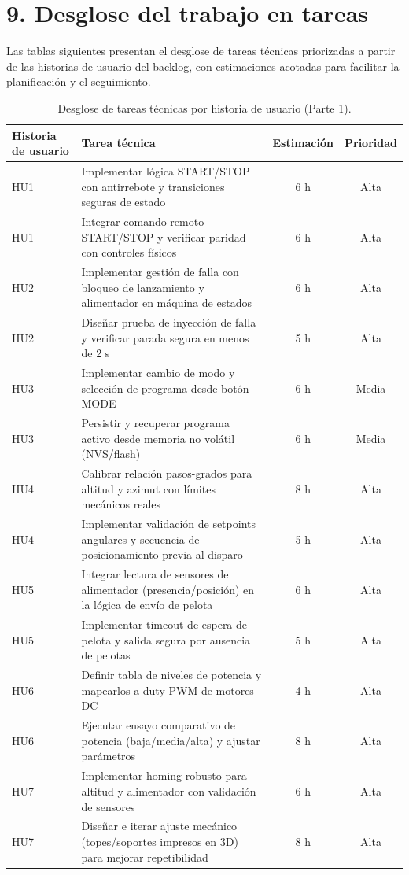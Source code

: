 ﻿\documentclass[
11pt, %
]{charter}
\begin{document}
\section{9. Desglose del trabajo en tareas}
\label{sec:wbs}
Las tablas siguientes presentan el desglose de tareas técnicas priorizadas a partir de las historias de usuario del backlog, con estimaciones acotadas para facilitar la planificación y el seguimiento.
\begin{table}[htpb]
\centering
\caption{Desglose de tareas técnicas por historia de usuario (Parte 1).}
\begin{tabularx}{\linewidth}{@{}|X|X|c|c|@{}}
\hline
\rowcolor[HTML]{C0C0C0}
Historia de usuario & Tarea técnica & Estimación & Prioridad \\ \hline
HU1 & Implementar lógica START/STOP con antirrebote y transiciones seguras de estado & 6 h & Alta \\ \hline
HU1 & Integrar comando remoto START/STOP y verificar paridad con controles físicos & 6 h & Alta \\ \hline
HU2 & Implementar gestión de falla con bloqueo de lanzamiento y alimentador en máquina de estados & 6 h & Alta \\ \hline
HU2 & Diseñar prueba de inyección de falla y verificar parada segura en menos de 2 s & 5 h & Alta \\ \hline
HU3 & Implementar cambio de modo y selección de programa desde botón MODE & 6 h & Media \\ \hline
HU3 & Persistir y recuperar programa activo desde memoria no volátil (NVS/flash) & 6 h & Media \\ \hline
HU4 & Calibrar relación pasos-grados para altitud y azimut con límites mecánicos reales & 8 h & Alta \\ \hline
HU4 & Implementar validación de setpoints angulares y secuencia de posicionamiento previa al disparo & 5 h & Alta \\ \hline
HU5 & Integrar lectura de sensores de alimentador (presencia/posición) en la lógica de envío de pelota & 6 h & Alta \\ \hline
HU5 & Implementar timeout de espera de pelota y salida segura por ausencia de pelotas & 5 h & Alta \\ \hline
HU6 & Definir tabla de niveles de potencia y mapearlos a duty PWM de motores DC & 4 h & Alta \\ \hline
HU6 & Ejecutar ensayo comparativo de potencia (baja/media/alta) y ajustar parámetros & 8 h & Alta \\ \hline
HU7 & Implementar homing robusto para altitud y alimentador con validación de sensores & 6 h & Alta \\ \hline
HU7 & Diseñar e iterar ajuste mecánico (topes/soportes impresos en 3D) para mejorar repetibilidad & 8 h & Alta \\ \hline
\end{tabularx}
\end{table}
\end{document}
